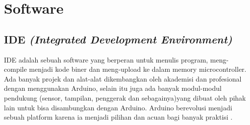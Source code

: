 \section{Software}
\subsection{IDE \textit{(Integrated Development Environment)}}
IDE adalah sebuah software yang berperan untuk menulis program, meng-compile menjadi kode biner dan meng-upload ke dalam memory microcontroller. Ada banyak projek dan alat-alat dikembangkan oleh akademisi dan profesional dengan menggunakan Arduino, selain itu juga ada banyak modul-modul pendukung (sensor, tampilan, penggerak dan sebagainya)yang dibuat oleh pihak lain untuk bisa disambungkan dengan Arduino. Arduino berevolusi menjadi sebuah platform karena ia menjadi pilihan dan acuan bagi banyak praktisi \cite{djuandi2011pengenalan}.
